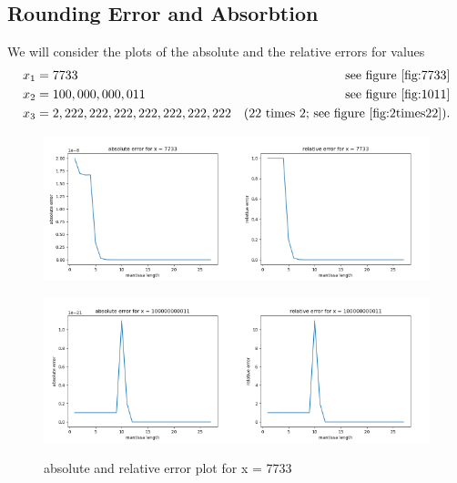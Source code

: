 \subsection{Rounding Error and Absorbtion}
We will consider the plots of the absolute and the relative errors for values
\begin{align*}
    x_1 &= 7733 & \text{ see figure \ref{fig:7733}}\\
    x_2 &= 100,000,000,011 & \text{ see figure \ref{fig:1011}}\\
    x_3 &= 2,222,222,222,222,222,222,222 & \text{(22 times 2; see figure \ref{fig:2times22})} \text{.}
\end{align*}
\begin{figure}[p]
    \centering
        \includegraphics[width=0.5\textwidth]{graphics/abs7733}\includegraphics[width=0.5\textwidth]{graphics/rel7733}
    \caption{absolute and relative error plot for x = 7733}\label{fig:7733}
    \centering
        \includegraphics[width=0.5\textwidth]{graphics/abs100000000011}\includegraphics[width=0.5\textwidth]{graphics/rel100000000011}

\end{figure}
